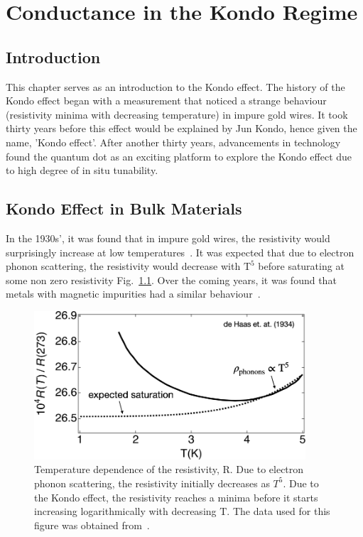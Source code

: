 \chapter{Conductance in the Kondo Regime}\label{cha:kondo_conductance}

\section{Introduction}
This chapter serves as an introduction to the Kondo effect. The history of the Kondo effect began with a measurement that noticed a strange behaviour (resistivity minima with decreasing temperature) in impure gold wires. It took thirty years before this effect would be explained by Jun Kondo, hence given the name, 'Kondo effect'. After another thirty years, advancements in technology found the quantum dot as an exciting platform to explore the Kondo effect due to high degree of in situ tunability. 


\afterpage{\clearpage}
\section{Kondo Effect in Bulk Materials}


In the 1930s', it was found that in impure gold wires, the resistivity would surprisingly increase at low temperatures~\cite{de_haas}. It was expected that due to electron phonon scattering, the resistivity would decrease with $\mathrm{T^5}$ before saturating at some non zero resistivity Fig.~\ref{fig:ch2/kondo_bulkmetal}. Over the coming years, it was found that metals with  magnetic impurities had a similar behaviour~\cite{still_irresistible}.


\begin{figure}[!hbt]
  \begin{center}
    \includegraphics[width=0.9\textwidth]{figures/ch2/crop_FiguresMaster.008.png}
    \caption[Kondo effect in bulk materials]{\label{fig:ch2/kondo_bulkmetal} 
    Temperature dependence of the resistivity, $\mathrm{R}$. Due to electron phonon scattering, the resistivity initially decreases as $T^5$. Due to the Kondo effect, the resistivity reaches a minima before it starts increasing logarithmically with decreasing $\mathrm{T}$. The data used for this figure was obtained from~\cite{de_haas}.
      }
  \end{center}
\end{figure}


